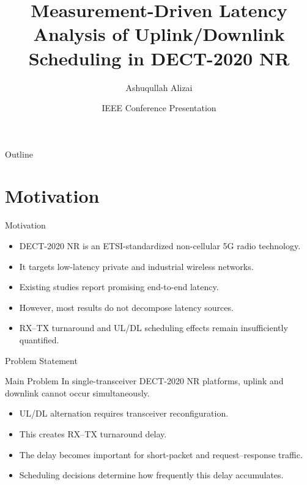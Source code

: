 \documentclass[10pt]{beamer}
\title[DECT-2020 NR Latency Analysis]{Measurement-Driven Latency Analysis of Uplink/Downlink Scheduling in DECT-2020 NR}
\author[A. Alizai et al.]{
Ashuqullah Alizai 
}
\institute[Aalen University]{
Aalen University of Applied Sciences\\
Aalen, Germany
}
\date{IEEE Conference Presentation}
\begin{document}
\begin{frame}
\titlepage
\end{frame}

\begin{frame}{Outline}
\tableofcontents
\end{frame}

\section{Motivation}

\begin{frame}{Motivation}
\begin{itemize}
    \item DECT-2020 NR is an ETSI-standardized non-cellular 5G radio technology.
    \item It targets low-latency private and industrial wireless networks.
    \item Existing studies report promising end-to-end latency.
    \item However, most results do not decompose latency sources.
    \item RX--TX turnaround and UL/DL scheduling effects remain insufficiently quantified.
\end{itemize}
\end{frame}

\begin{frame}{Problem Statement}
\begin{block}{Main Problem}
In single-transceiver DECT-2020 NR platforms, uplink and downlink cannot occur simultaneously.
\end{block}

\begin{itemize}
    \item UL/DL alternation requires transceiver reconfiguration.
    \item This creates RX--TX turnaround delay.
    \item The delay becomes important for short-packet and request--response traffic.
    \item Scheduling decisions determine how frequently this delay accumulates.
\end{itemize}
\end{frame}

\end{document}
